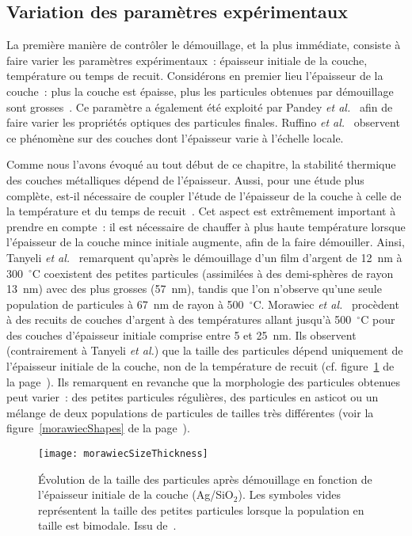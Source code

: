 	\subsection{Variation des paramètres expérimentaux}
La première manière de contrôler le démouillage, et la plus immédiate, consiste à faire varier les paramètres expérimentaux~: épaisseur initiale de la couche, température ou temps de recuit. Considérons en premier lieu l'épaisseur de la couche~: plus la couche est épaisse, plus les particules obtenues par démouillage sont grosses~\cite{schmidl2015formation, naffouti2016fabrication}. Ce paramètre a également été exploité par Pandey \textit{et al.}~\cite{pandey2017morphological} afin de faire varier les propriétés optiques des particules finales. Ruffino \textit{et al.}~\cite{ruffino2014self} observent ce phénomène sur des couches dont l'épaisseur varie à l'échelle locale.\par 
Comme nous l'avons évoqué au tout début de ce chapitre, la stabilité thermique des couches métalliques dépend de l'épaisseur. Aussi, pour une étude plus complète, est-il nécessaire de coupler l'étude de l'épaisseur de la couche à celle de la température et du temps de recuit~\cite{manuela2013dewetting}. Cet aspect est extrêmement important à prendre en compte~: il est nécessaire de chauffer à plus haute température lorsque l'épaisseur de la couche mince initiale augmente, afin de la faire démouiller. Ainsi, Tanyeli \textit{et al.}~\cite{tanyeli2013effect} remarquent qu'après le démouillage d'un film d'argent de 12~nm à 300~$^\circ$C coexistent des petites particules (assimilées à des demi-sphères de rayon 13~nm) avec des plus grosses (57~nm), tandis que l'on n'observe qu'une seule population de particules à 67~nm de rayon à 500~$^\circ$C. Morawiec \textit{et al.}~\cite{morawiec2013self} procèdent à des recuits de couches d'argent à des températures allant jusqu'à 500~$^\circ$C pour des couches d'épaisseur initiale comprise entre 5 et 25~nm. Ils observent (contrairement à Tanyeli \textit{et al.}) que la taille des particules dépend uniquement de l'épaisseur initiale de la couche, non de la température de recuit (cf. figure~\ref{morawiecSizeThickness} de la page~\pageref{morawiecSizeThickness}). Ils remarquent en revanche que la morphologie des particules obtenues peut varier~: des petites particules régulières, des particules en asticot ou un mélange de deux populations de particules de tailles très différentes (voir la figure~\ref{morawiecShapes} de la page~\pageref{morawiecShapes}).\par
\begin{figure}[!p]
	\centering
	\texttt{[image: morawiecSizeThickness]}
	\caption{Évolution de la taille des particules après démouillage en fonction de l'épaisseur initiale de la couche (Ag/SiO$_2$). Les symboles vides représentent la taille des petites particules lorsque la population en taille est bimodale. Issu de~\cite{morawiec2013self}.}
	\label{morawiecSizeThickness}
\end{figure}
